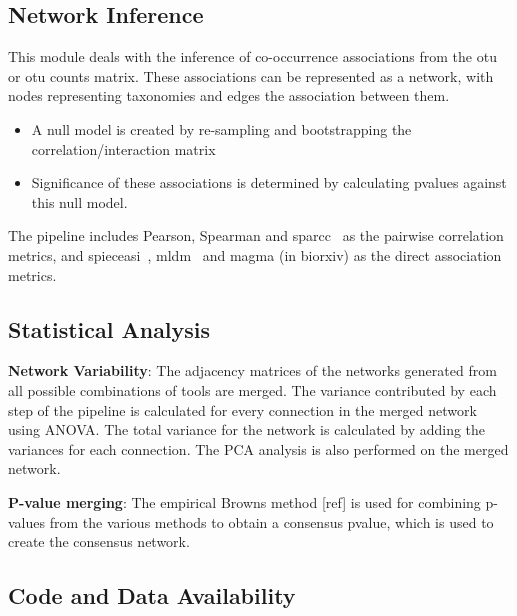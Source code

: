   \subsection*{Network Inference}
  \vspace{-5mm}
  This module deals with the inference of co-occurrence associations from the \ac{otu} or \ac{otu} counts matrix.
  These associations can be represented as a network, with nodes representing taxonomies and edges the association between them.
  \begin{itemize}
    \item A null model is created by re-sampling and bootstrapping the correlation/interaction matrix
    \item Significance of these associations is determined by calculating pvalues against this null model.
  \end{itemize}
  The pipeline includes Pearson, Spearman and \ac{sparcc}~\cite{Friedman2012} as the pairwise correlation metrics, and \ac{spieceasi}~\cite{Kurtz2015}, \ac{mldm}~\cite{Yang2017} and \ac{magma} (in biorxiv) as the direct association metrics.

  \subsection*{Statistical Analysis}

  \textbf{Network Variability}:
  The adjacency matrices of the networks generated from all possible combinations of tools are merged.
  The variance contributed by each step of the pipeline is calculated for every connection in the merged network using ANOVA.
  The total variance for the network is calculated by adding the variances for each connection.
  The PCA analysis is also performed on the merged network.



\textbf{P-value merging}:
The empirical Browns method [ref] is used for combining p-values from the various methods to obtain a consensus pvalue, which is used to create the consensus network.

  \subsection*{Code and Data Availability}
